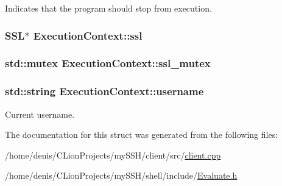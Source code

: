 Indicates that the program should stop from execution. 

\subsubsection[{\texorpdfstring{ssl}{ssl}}]{\setlength{\rightskip}{0pt plus 5cm}S\+SL$\ast$ Execution\+Context\+::ssl}\hypertarget{structExecutionContext_afce3bfa5f05214b9b0d57ac1edb0a0f4}{}\label{structExecutionContext_afce3bfa5f05214b9b0d57ac1edb0a0f4}
\subsubsection[{\texorpdfstring{ssl\+\_\+mutex}{ssl_mutex}}]{\setlength{\rightskip}{0pt plus 5cm}std\+::mutex Execution\+Context\+::ssl\+\_\+mutex}\hypertarget{structExecutionContext_a241cad372197f9880a9af9e93ecd7633}{}\label{structExecutionContext_a241cad372197f9880a9af9e93ecd7633}
\subsubsection[{\texorpdfstring{username}{username}}]{\setlength{\rightskip}{0pt plus 5cm}std\+::string Execution\+Context\+::username}\hypertarget{structExecutionContext_a6c1bbd4dcfc82e4902c4382af69ab6d9}{}\label{structExecutionContext_a6c1bbd4dcfc82e4902c4382af69ab6d9}


Current username. 



The documentation for this struct was generated from the following files\+:\begin{DoxyCompactItemize}
\item 
/home/denis/\+C\+Lion\+Projects/my\+S\+S\+H/client/src/\hyperlink{client_8cpp}{client.\+cpp}\item 
/home/denis/\+C\+Lion\+Projects/my\+S\+S\+H/shell/include/\hyperlink{Evaluate_8h}{Evaluate.\+h}\end{DoxyCompactItemize}
